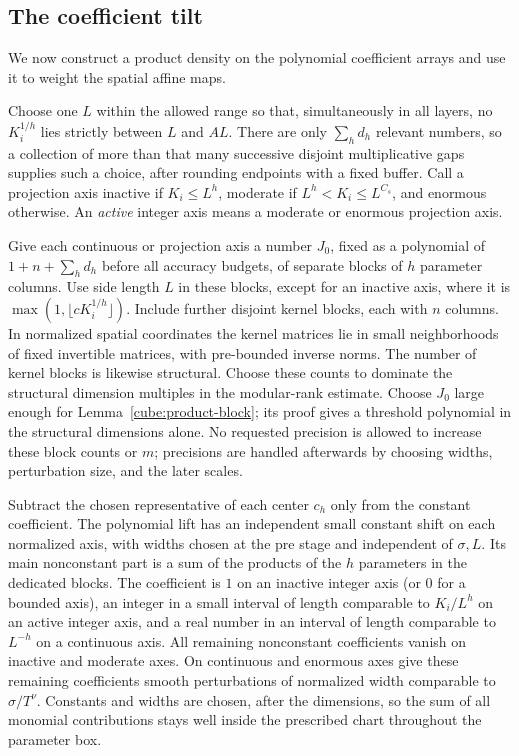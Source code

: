 \subsection{The coefficient tilt}

We now construct a product density on the polynomial coefficient arrays
and use it to weight the spatial affine maps.

Choose one $L$ within the allowed range so that, simultaneously in
all layers, no $K_i^{1/h}$ lies strictly between $L$ and $AL$. There are only
$\sum_hd_h$ relevant numbers, so a collection of more than that many
successive disjoint multiplicative gaps supplies such a choice, after
rounding endpoints with a fixed buffer.  Call a projection axis inactive if
$K_i\le L^h$, moderate if $L^h<K_i\le L^{C_s}$, and enormous otherwise.
An \emph{active} integer axis means a moderate or enormous projection axis.

Give each continuous or projection axis a number $J_0$, fixed as a
polynomial of $1+n+\sum_hd_h$ before all accuracy budgets, of separate blocks of $h$ parameter columns.  Use side length $L$ in these
blocks, except for an inactive axis, where it is
$\max(1,\lfloor cK_i^{1/h}\rfloor)$.  Include further disjoint kernel
blocks, each with $n$ columns.  In normalized spatial coordinates the kernel
matrices lie in small neighborhoods of fixed invertible matrices, with
pre-bounded inverse norms.  The number of kernel blocks is likewise
structural.  Choose these counts to dominate the structural dimension
multiples in the modular-rank estimate.  Choose $J_0$ large enough for
Lemma~\ref{cube:product-block}; its proof gives a threshold polynomial
in the structural dimensions alone.  No requested precision is allowed
to increase these block counts or $m$; precisions are handled afterwards
by choosing widths, perturbation size, and the later scales.

Subtract the chosen representative of each center $c_h$ only from the
constant coefficient.  The polynomial lift has an
independent small constant shift on each normalized axis, with widths
chosen at the pre stage and independent of $\sigma,L$.  Its main
nonconstant part is a sum of the products of the $h$
parameters in the dedicated blocks.  The coefficient is $1$ on an inactive
integer axis (or $0$ for a bounded axis), an integer in a small interval
of length comparable to $K_i/L^h$ on an active integer axis, and a real
number in an interval of length comparable to $L^{-h}$ on a continuous
axis.  All remaining nonconstant coefficients vanish on inactive and
moderate axes.  On continuous and enormous axes give these remaining
coefficients smooth perturbations of normalized
width comparable to $\sigma/T^\nu$.  Constants and widths are chosen,
after the dimensions, so the sum of all monomial contributions stays well
inside the prescribed chart throughout the parameter box.

